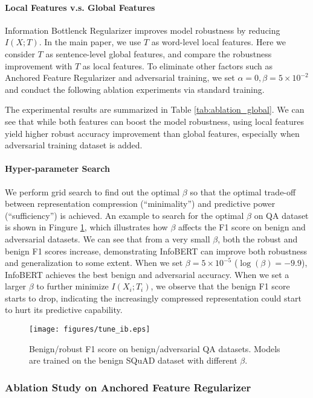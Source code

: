 \documentclass{article} \usepackage{iclr2021_conference,times}
\theoremstyle{definition}
\theoremstyle{remark}
\newcommand{\method}{InfoBERT\xspace}
\begin{document}
\paragraph{Local Features v.s. Global Features} Information Bottlenck Regularizer improves model robustness by reducing $I(X;T)$. In the main paper, we use $T$ as word-level local features. Here we consider $T$ as sentence-level global features, and compare the robustness improvement with $T$ as local features. To eliminate other factors such as Anchored Feature Regularizer and adversarial training, we set $\alpha=0, \beta=5 \times 10^{-2}$ and conduct the following ablation experiments via standard training. 

The experimental results are summarized in Table \ref{tab:ablation_global}. We can see that while both features can boost the model robustness, using local features yield higher robust accuracy improvement than global features, especially when adversarial training dataset is added. 

\paragraph{Hyper-parameter Search} We perform grid search to find out the optimal $\beta$ so that the optimal trade-off between representation compression (``minimality'') and predictive power (``sufficiency'') is achieved. An example to search for the optimal $\beta$ on QA dataset is shown in Fingure \ref{fig:ablation_beta}, which illustrates how $\beta$ affects the F1 score on benign and adversarial datasets. We can see that from a very small $\beta$, both the robust and benign F1 scores increase, demonstrating \method can improve both robustness and generalization to some extent. When we set $\beta=5\times10^{-5}$ ($\log(\beta)=-9.9$), \method achieves the best benign and adversarial accuracy. When we set a larger $\beta$ to further minimize $I(X_i;T_i)$, we observe that the benign F1 score starts to drop, indicating the increasingly compressed representation could start to hurt its predictive capability.
\begin{figure}[t]
    \centering
    \texttt{[image: figures/tune\_ib.eps]}
    \caption{Benign/robust F1 score on benign/adversarial QA datasets. Models are trained on the benign SQuAD dataset with different $\beta$.}
    \label{fig:ablation_beta}
\end{figure}


\subsubsection{Ablation Study on Anchored Feature Regularizer}
\end{document}
